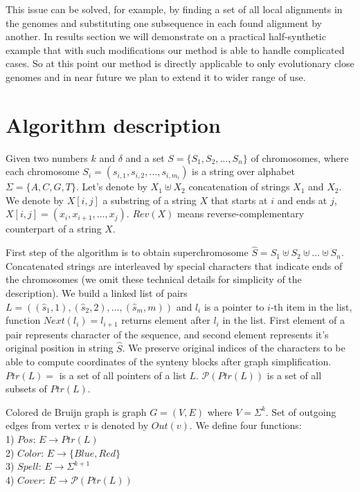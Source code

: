 \documentclass[a4paper, 12pt]{scrartcl}
\begin{document}
This issue can be solved, for example, by finding a set of all local alignments in the genomes and substituting one subsequence in each found alignment
by another. In results section we will demonstrate on a practical half-synthetic example that with such modifications our method is able to handle
complicated cases. So at this point our method is directly applicable to only evolutionary close genomes and  in near future we plan to extend it to
wider range of use.

\section{Algorithm description}

Given two numbers \(k\) and \(\delta\) and a set \(S = \lbrace S_{1}, S_{2}, \ldots, S_{n} \rbrace \) of chromosomes,
where each chromosome  \(S_{i} = (s_{i, 1}, s_{i, 2}, \ldots, s_{i, m_i})\) is a string over alphabet \(\Sigma = \lbrace A, C, G, T \rbrace\).
Let's denote by \(X_{1} \uplus X_{2}\) concatenation of strings \(X_{1}\) and \(X_{2}\). We denote by \(X[i, j]\) a substring of a string \(X\) that
starts at \(i\) and ends at \(j\), \(X[i, j] = (x_{i}, x_{i + 1}, \ldots, x_{j}) \). \(Rev(X)\) means reverse-complementary counterpart of a string \(X\).

First step of the algorithm is to obtain superchromosome \(\hat{S} = S_{1} \uplus S_{2} \uplus \ldots \uplus S_{n} \). Concatenated
strings are interleaved by special characters that indicate ends of the chromosomes (we omit these technical details for simplicity of the description). 
We build a linked list of
pairs \(L = ((\hat{s}_1, 1), (\hat{s}_2, 2), \ldots, (\hat{s}_{m}, m))\) and \(l_i\) is a pointer to \(i\)-th item in the list, function \(Next(l_i) = l_{i + 1}\) returns
element after \(l_i\) in the list.
First element of a pair represents character of the sequence, and second element represents it's original position in string \(\hat{S}\). We preserve
original indices of the characters to be able to compute coordinates of the synteny blocks after graph simplification.
\(Ptr(L) = \) is a set of all pointers of a list \(L\). \( \mathcal P \left({Ptr(L)}\right) \) is a set of all subsets of \(Ptr(L)\).

Colored de Bruijn graph is graph \(G = (V, E) \) where \(V = \Sigma ^ k \). Set of outgoing edges from vertex \(v\) is denoted by \(Out(v)\). We define four functions: \\
1) \(Pos : \, E \rightarrow Ptr(L) \) \\
2) \(Color : \, E \rightarrow \lbrace Blue, Red \rbrace \) \\
3) \(Spell: \, E \rightarrow \Sigma ^ {k + 1} \) \\
4) \(Cover: \, E \rightarrow  \mathcal P \left({Ptr(L)}\right) \)
\end{document}

